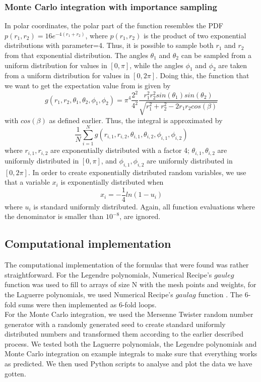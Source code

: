 \documentclass[10pt,a4paper]{article}
\begin{document}
\subsubsection{Monte Carlo integration with importance sampling}
In polar coordinates, the polar part of the function resembles the PDF $p(r_1,r_2)=16e^{-4(r_1+r_2)}$, where $p(r_1,r_2)$ is the product of two exponential distributions with parameter=4. Thus, it is possible to sample both $r_1$ and $r_2$ from that exponential distribution.
The angles $\theta_1$ and $\theta_2$ can be sampled from a uniform distribution for values in $[0,\pi]$, while the angles  $\phi_1$ and $\phi_2$ are taken from a uniform distribution for values in $[0,2\pi]$. Doing this, the function that we want to get the expectation value from is given by
$$g(r_1,r_2,\theta_1,\theta_2,\phi_1,\phi_2)=\pi^4\frac{2^2}{4^2}\frac{r_1^2r_2^2sin(\theta_1)sin(\theta_2)}{\sqrt{r_1^2+r_2^2-2r_1r_2cos(\beta)}}$$
with $cos(\beta)$ as defined earlier.
Thus, the integral is approximated by
$$\frac{1}{N}\sum_{i=1}^{N}g(r_{i,1},r_{i,2},\theta_{i,1},\theta_{i,2},\phi_{i,1},\phi_{i,2})$$
where $r_{i,1},r_{i,2}$ are exponentially distributed with a factor 4;  $\theta_{i,1},\theta_{i,2}$ are uniformly distributed in $[0,\pi]$, and  $\phi_{i,1},\phi_{i,2}$  are uniformly distributed in $[0,2\pi]$. In order to create exponentially distributed random variables, we use that a variable $x_i$ is exponentially distributed when
$$x_i=-\frac{1}{4}ln(1-u_i)$$
where $u_i$ is standard uniformly distributed. Again, all function evaluations where the denominator is smaller than $10^{-8}$, are ignored.
\subsection{Computational implementation}
The computational implementation of the formulas that were found was rather straightforward. For the Legendre polynomials, Numerical Recipe's ${\textit{gauleg}}$ function was used to fill to arrays of size N with the mesh points and weights, for the Laguerre polynomials, we used Numerical Recipe's ${\textit{gaulag}}$ function \cite{press1992numerical}. The 6-fold sums were then implemented as 6-fold loops.\\
For the Monte Carlo integration, we used the Mersenne Twister random number generator with a randomly generated seed to create standard uniformly distributed numbers and transformed them according to the earlier described process. We tested both the Laguerre polynomials, the Legendre polynomials and Monte Carlo integration on example integrals to make sure that everything works as predicted. We then used Python scripts to analyse and plot the data we have gotten.
\end{document}
